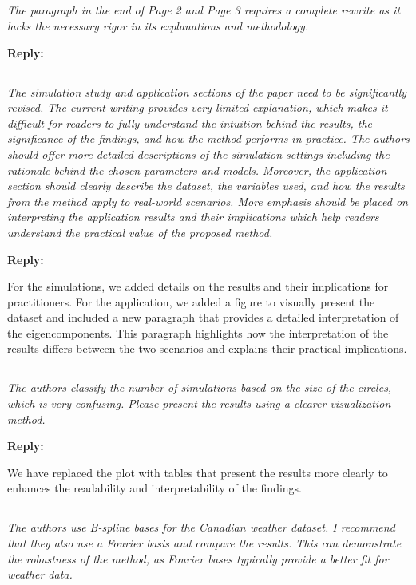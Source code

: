 \documentclass[12pt,a4paper]{article}
\newcommand{\comments}[1]{\subsection{}
\begin{mdframed}[style=comments] 
        \textit{#1}
\end{mdframed}}
\newcommand{\reply}[1]{
    \noindent\textbf{Reply:}

\begin{mdframed}[style=replies] 
    #1
\end{mdframed}
}
\begin{document}
\comments{The paragraph in the end of Page 2 and Page 3 requires a complete rewrite as it lacks the necessary rigor in its explanations and methodology.}

\reply{}

\comments{The simulation study and application sections of the paper need to be significantly revised. The current writing provides very limited explanation, which makes it difficult for readers to fully understand the intuition behind the results, the significance of the findings, and how the method performs in practice. The authors should offer more detailed descriptions of the simulation settings including the rationale behind the chosen parameters and models. Moreover, the application section should clearly describe the dataset, the variables used, and how the results from the method apply to real-world scenarios. More emphasis should be placed on interpreting the application results and their implications which help readers understand the practical value of the proposed method.}

\reply{For the simulations, we added details on the results and their implications for practitioners.
For the application, we added a figure to visually present the dataset and included a new paragraph that provides a detailed interpretation of the eigencomponents. This paragraph highlights how the interpretation of the results differs between the two scenarios and explains their practical implications.}

\comments{The authors classify the number of simulations based on the size of the circles, which is very confusing. Please present the results using a clearer visualization method.}

\reply{We have replaced the plot with tables that present the results more clearly to enhances the readability and interpretability of the findings.}

\comments{The authors use B-spline bases for the Canadian weather dataset. I recommend that they also use a Fourier basis and compare the results. This can demonstrate the robustness of the method, as Fourier bases typically provide a better fit for weather data.}
\end{document}
